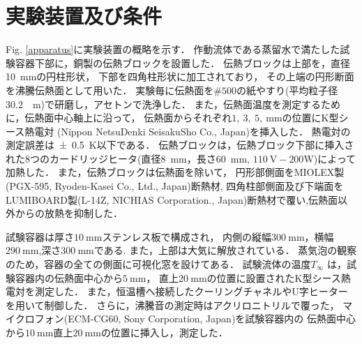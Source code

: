 \section{実験装置及び条件}
Fig. \ref{apparatus}に実験装置の概略を示す．
作動流体である蒸留水で満たした試験容器下部に，銅製の伝熱ブロックを設置した．
伝熱ブロックは上部を，直径\SI{10}{~mm}の円柱形状，
下部を四角柱形状に加工されており，
その上端の円形断面を沸騰伝熱面として用いた．
実験毎に伝熱面を$\# 500$の紙やすり(平均粒子径 \SI{30.2}{~\mu m})で研磨し，アセトンで洗浄した．
また，伝熱面温度を測定するために，伝熱面中心軸上に沿って，
伝熱面からそれぞれ$1,~3,~5,~\mathrm{mm}$の位置にK型シース熱電対
(Nippon NetsuDenki SeisakuSho Co., Japan)を挿入した．
熱電対の測定誤差は\SI{\pm0.5}{~K}以下である．
伝熱ブロックは，伝熱ブロック下部に挿入された$8$つのカードリッジヒータ(直径\SI{8}{~mm}，長さ\SI{60}{~mm}, $110~\mathrm{V}-200\mathrm{W}$)によって加熱した．
また，伝熱ブロックは伝熱面を除いて，
円形部側面をMIOLEX製(PGX-595, Ryoden-Kasei Co., Ltd., Japan)断熱材,
四角柱部側面及び下端面をLUMIBOARD\texttrademark{}製(L-14Z, NICHIAS Corporation., Japan)断熱材で覆い,伝熱面以外からの放熱を抑制した．

試験容器は厚さ$10~\mathrm{mm}$ステンレス板で構成され，
内側の縦幅$300~\mathrm{mm}$，横幅$290~\mathrm{mm}$,深さ$300~\mathrm{mm}$である.
また，上部は大気に解放されている．
蒸気泡の観察のため，容器の全ての側面に可視化窓を設けてある．
試験流体の温度$T_\infty$
は，試験容器内の伝熱面中心から$5~\mathrm{mm}$，
直上$20~\mathrm{mm}$の位置に設置されたK型シース熱電対を測定した．
また，恒温槽へ接続したクーリングチャネルやU字ヒーターを用いて制御した．
さらに，沸騰音の測定時はアクリロニトリルで覆った，
マイクロフォン(ECM-CG60, Sony Corporation, Japan)を試験容器内の
伝熱面中心から$10~\mathrm{mm}$直上$20~\mathrm{mm}$の位置に挿入し，測定した．

